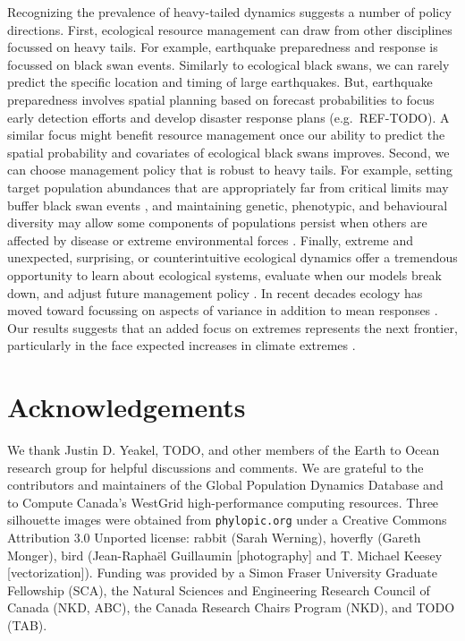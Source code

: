 Recognizing the prevalence of heavy-tailed dynamics suggests a number of policy
directions. First, ecological resource management can draw from other
disciplines focussed on heavy tails. For example, earthquake preparedness and
response is focussed on black swan events. Similarly to ecological black swans,
we can rarely predict the specific location and timing of large earthquakes.
But, earthquake preparedness involves spatial planning based on forecast
probabilities to focus early detection efforts and develop disaster response
plans (e.g.~REF-TODO). A similar focus might benefit resource management once our
ability to predict the spatial probability and covariates of ecological black
swans improves. Second, we can choose management policy that is robust to heavy
tails. For example, setting target population abundances that are appropriately
far from critical limits may buffer black swan events
\citep[e.g.][]{caddy1996}, and maintaining genetic, phenotypic, and behavioural
diversity may allow some components of populations persist when others are
affected by disease or extreme environmental forces
\citep[e.g.][]{schindler2010, anderson2014}. Finally, extreme and unexpected,
surprising, or counterintuitive ecological dynamics offer a tremendous
opportunity to learn about ecological systems, evaluate when our models break
down, and adjust future management policy \citep{doak2008, pine-iii2009,
  lindenmayer2010}. In recent decades ecology has moved toward focussing on
aspects of variance in addition to mean responses \citep[e.g.][]{loreau2010a,
  thompson2013}. Our results suggests that an added focus on extremes
represents the next frontier, particularly in the face expected increases in
climate extremes \citep{meehl2004,ipcc2012}.

\section{Acknowledgements}

We thank Justin D. Yeakel, TODO, and other members of the Earth to Ocean
research group for helpful discussions and comments. We are grateful to the
contributors and maintainers of the Global Population Dynamics Database and to
Compute Canada's WestGrid high-performance computing resources. Three
silhouette images were obtained from \texttt{phylopic.org} under a Creative
Commons Attribution 3.0 Unported license: rabbit (Sarah Werning), hoverfly
(Gareth Monger), bird (Jean-Raphaël Guillaumin {[}photography{]} and T. Michael
Keesey {[}vectorization{]}). Funding was provided by a Simon Fraser University
Graduate Fellowship (SCA), the Natural Sciences and Engineering Research
Council of Canada (NKD, ABC), the Canada Research Chairs Program (NKD), and
TODO (TAB).

